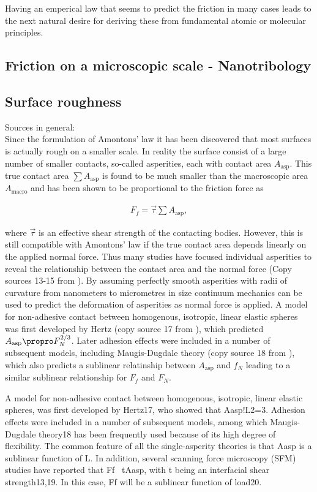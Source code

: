 Having an emperical law that seems to predict the friction in many cases leads to the next natural desire for deriving these from fundamental atomic or molecular principles.

\subsection{Friction on a microscopic scale - Nanotribology}
\subsection{Surface roughness}

Sources in general: \cite{mo_friction_2009} \\

Since the formulation of Amontons’ law it has been discovered that most surfaces is actually rough on a smaller scale. In reality the surface consist of a large number of smaller contacts, so-called asperities, each with contact area $A_{\text{asp}}$. This true contact area $\sum A_{\text{asp}}$ is found to be much smaller than the macroscopic area $A_{\text{macro}}$ and has been shown to be proportional to the friction force as

\begin{align*}
  F_f = \vec{\tau} \sum A_{\text{asp}},
\end{align*}

where $\vec{\tau}$ is an effective shear strength of the contacting bodies. However, this is still compatible with Amontons’ law if the true contact area depends linearly on the applied normal force. Thus many studies have focused individual asperities to reveal the relationship between the contact area and the normal force  (Copy sources 13-15 from \cite{mo_friction_2009}). By assuming perfectly smooth asperities with radii of curvature from nanometers to micrometres in size continuum mechanics can be used to predict the deformation of asperities as normal force is applied. A model for non-adhesive contact between homogenous, isotropic, linear elastic spheres was first developed by Hertz (copy source 17 from \cite{mo_friction_2009}), which predicted $A_{\text{asp}} \propro F_N^{2/3}$. Later adhesion effects were included in a number of subsequent models, including Maugis-Dugdale theory (copy source 18 from \cite{mo_friction_2009}), which also predicts a sublinear relatinship between $A_{\text{asp}}$ and $f_N$ leading to a similar sublinear relationship for $F_f$ and $F_N$.

A model for non-adhesive contact between homogenous, isotropic, linear elastic spheres, was first developed by Hertz17, who showed that Aasp!L2=3. Adhesion effects were included in a number of subsequent models, among which Maugis-Dugdale theory18 has been frequently used because of its high degree of flexibility. The common feature of all the single-asperity theories is that Aasp is a sublinear function of L. In addition, several scanning force microscopy (SFM) studies have reported that Ff ~tAasp, with t being an interfacial shear strength13,19. In this case, Ff will be a sublinear function of load20.


